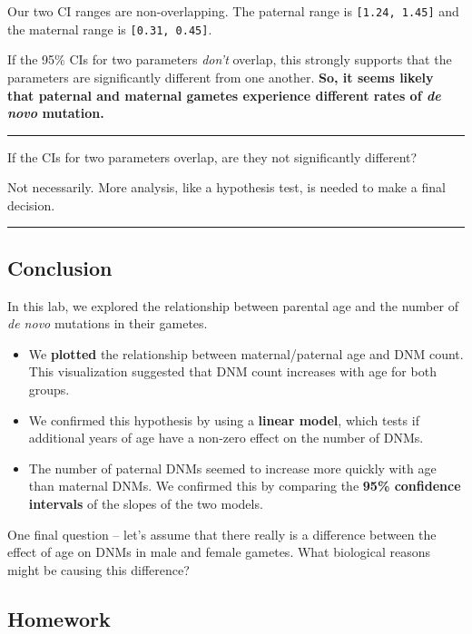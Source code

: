 \documentclass[
]{article}
\providecommand{\tightlist}{%
  \setlength{\itemsep}{0pt}\setlength{\parskip}{0pt}}
\begin{document}
Our two CI ranges are non-overlapping. The paternal range is
\texttt{{[}1.24,\ 1.45{]}} and the maternal range is
\texttt{{[}0.31,\ 0.45{]}}.

If the 95\% CIs for two parameters \emph{don't} overlap, this strongly
supports that the parameters are significantly different from one
another. \textbf{So, it seems likely that paternal and maternal gametes
experience different rates of \emph{de novo} mutation.}

\begin{center}\rule{0.5\linewidth}{0.5pt}\end{center}

If the CIs for two parameters overlap, are they not significantly
different?

Not necessarily. More analysis, like a hypothesis test, is needed to
make a final decision.

\begin{center}\rule{0.5\linewidth}{0.5pt}\end{center}

\subsection{Conclusion}\label{conclusion}

In this lab, we explored the relationship between parental age and the
number of \emph{de novo} mutations in their gametes.

\begin{itemize}
\tightlist
\item
  We \textbf{plotted} the relationship between maternal/paternal age and
  DNM count. This visualization suggested that DNM count increases with
  age for both groups.
\item
  We confirmed this hypothesis by using a \textbf{linear model}, which
  tests if additional years of age have a non-zero effect on the number
  of DNMs.
\item
  The number of paternal DNMs seemed to increase more quickly with age
  than maternal DNMs. We confirmed this by comparing the \textbf{95\%
  confidence intervals} of the slopes of the two models.
\end{itemize}

One final question -- let's assume that there really is a difference
between the effect of age on DNMs in male and female gametes. What
biological reasons might be causing this difference?

\subsection{Homework}\label{homework}
\end{document}
